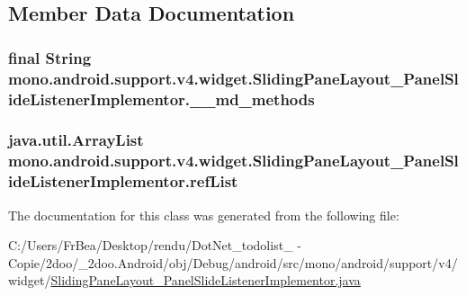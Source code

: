 \subsection{Member Data Documentation}
\hypertarget{classmono_1_1android_1_1support_1_1v4_1_1widget_1_1_sliding_pane_layout___panel_slide_listener_implementor_f5c07052b8f832c32fcbb060679961a9}{
\subsubsection[{\_\-\_\-md\_\-methods}]{\setlength{\rightskip}{0pt plus 5cm}final String {\bf mono.android.support.v4.widget.SlidingPaneLayout\_\-PanelSlideListenerImplementor.\_\-\_\-md\_\-methods}}}
\label{classmono_1_1android_1_1support_1_1v4_1_1widget_1_1_sliding_pane_layout___panel_slide_listener_implementor_f5c07052b8f832c32fcbb060679961a9}


\hypertarget{classmono_1_1android_1_1support_1_1v4_1_1widget_1_1_sliding_pane_layout___panel_slide_listener_implementor_83018c087ce3d6a4d5e71746eab874ad}{
\subsubsection[{refList}]{\setlength{\rightskip}{0pt plus 5cm}java.util.ArrayList {\bf mono.android.support.v4.widget.SlidingPaneLayout\_\-PanelSlideListenerImplementor.refList}}}
\label{classmono_1_1android_1_1support_1_1v4_1_1widget_1_1_sliding_pane_layout___panel_slide_listener_implementor_83018c087ce3d6a4d5e71746eab874ad}




The documentation for this class was generated from the following file:\begin{CompactItemize}
\item 
C:/Users/FrBea/Desktop/rendu/DotNet\_\-todolist\_ - Copie/2doo/\_\-2doo.Android/obj/Debug/android/src/mono/android/support/v4/widget/\hyperlink{_sliding_pane_layout___panel_slide_listener_implementor_8java}{SlidingPaneLayout\_\-PanelSlideListenerImplementor.java}\end{CompactItemize}
